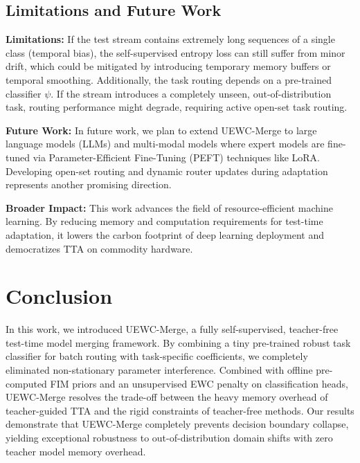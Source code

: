 \documentclass{article}
\theoremstyle{plain}
\theoremstyle{definition}
\theoremstyle{remark}
\begin{document}
\subsection{Limitations and Future Work}
\textbf{Limitations:} If the test stream contains extremely long sequences of a single class (temporal bias), the self-supervised entropy loss can still suffer from minor drift, which could be mitigated by introducing temporary memory buffers or temporal smoothing. Additionally, the task routing depends on a pre-trained classifier $\psi$. If the stream introduces a completely unseen, out-of-distribution task, routing performance might degrade, requiring active open-set task routing.

\textbf{Future Work:} In future work, we plan to extend UEWC-Merge to large language models (LLMs) and multi-modal models where expert models are fine-tuned via Parameter-Efficient Fine-Tuning (PEFT) techniques like LoRA. Developing open-set routing and dynamic router updates during adaptation represents another promising direction.

\textbf{Broader Impact:} This work advances the field of resource-efficient machine learning. By reducing memory and computation requirements for test-time adaptation, it lowers the carbon footprint of deep learning deployment and democratizes TTA on commodity hardware.

\section{Conclusion}
In this work, we introduced UEWC-Merge, a fully self-supervised, teacher-free test-time model merging framework. By combining a tiny pre-trained robust task classifier for batch routing with task-specific coefficients, we completely eliminated non-stationary parameter interference. Combined with offline pre-computed FIM priors and an unsupervised EWC penalty on classification heads, UEWC-Merge resolves the trade-off between the heavy memory overhead of teacher-guided TTA and the rigid constraints of teacher-free methods. Our results demonstrate that UEWC-Merge completely prevents decision boundary collapse, yielding exceptional robustness to out-of-distribution domain shifts with zero teacher model memory overhead.

\nocite{*}




\newpage
\appendix
\onecolumn
\end{document}
